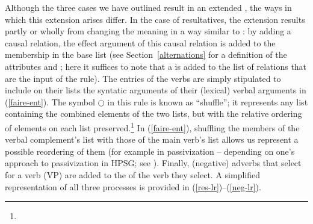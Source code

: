\documentclass[output=paper
 	        ,biblatex
                ,babelshorthands
                ,newtxmath
                ,draftmode
                ,colorlinks, citecolor=brown
]{langscibook}
\begin{document}
Although the three cases we have outlined result in an extended \argst, the ways in which this extension arises differ. In the case of resultatives, the extension results partly or wholly from changing the meaning in a way similar to \citet{RappaportandLevin1998}: by adding a causal relation, the effect argument of this causal relation is added to the membership in the base \argst list (see Section~\ref{alternations} for a definition of the attributes  and ; here it suffices to note that a  is added to the list of relations that are the input of the rule). 
The entries of the  verbs are simply stipulated to include on their \argst lists the syntatic arguments of their (lexical) verbal arguments in (\ref{faire-ent}).
The symbol $\bigcirc$\is{$\bigcirc$} in this rule is known as ``shuffle''; it represents any list 
containing the combined elements of the two lists, but with the relative ordering of elements on each list preserved.\footnote{
}
In (\ref{faire-ent}), shuffling the members of the verbal complement's \argst list with those of the main verb's \argst list allows us  represent a possible reordering of them (for example in passivization -- depending on one's approach to passivization in HPSG; see ).
Finally, (negative) adverbs that select for a verb (VP) are added to the \argst of the verb they select. A simplified representation of all three processes is provided in (\ref{res-lr})--(\ref{neg-lr}). 
\end{document}
